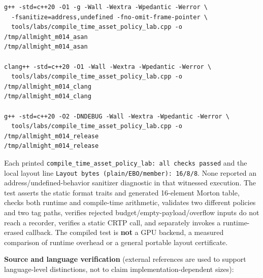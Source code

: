 \begin{verbatim}
g++ -std=c++20 -O1 -g -Wall -Wextra -Wpedantic -Werror \
  -fsanitize=address,undefined -fno-omit-frame-pointer \
  tools/labs/compile_time_asset_policy_lab.cpp -o /tmp/allmight_m014_asan
/tmp/allmight_m014_asan

clang++ -std=c++20 -O1 -Wall -Wextra -Wpedantic -Werror \
  tools/labs/compile_time_asset_policy_lab.cpp -o /tmp/allmight_m014_clang
/tmp/allmight_m014_clang

g++ -std=c++20 -O2 -DNDEBUG -Wall -Wextra -Wpedantic -Werror \
  tools/labs/compile_time_asset_policy_lab.cpp -o /tmp/allmight_m014_release
/tmp/allmight_m014_release
\end{verbatim}

Each printed \texttt{compile\_time\_asset\_policy\_lab:\ all\ checks\ passed} and the local layout line \texttt{Layout\ bytes\ (plain/EBO/member):\ 16/8/8}. None reported an address/undefined-behavior sanitizer diagnostic in that witnessed execution. The test asserts the static format traits and generated 16-element Morton table, checks both runtime and compile-time arithmetic, validates two different policies and two tag paths, verifies rejected budget/empty-payload/overflow inputs do not reach a recorder, verifies a static CRTP call, and separately invokes a runtime-erased callback. The compiled test is \textbf{not} a GPU backend, a measured comparison of runtime overhead or a general portable layout certificate.

\textbf{Source and language verification} (external references are used to support language-level distinctions, not to claim implementation-dependent sizes):

